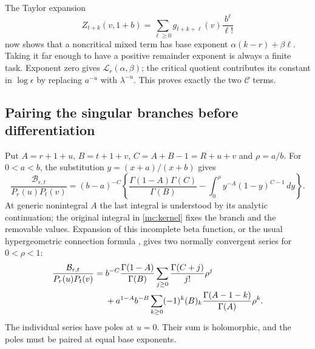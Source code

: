 \documentclass[11pt,a4paper]{article}
\numberwithin{equation}{section}
\theoremstyle{definition}
\theoremstyle{remark}
\begin{document}
The Taylor expansion
\[
 Z_{t+k}(v,1+b)=\sum_{\ell\ge0}
                       g_{t+k+\ell}(v)\frac{b^\ell}{\ell!}
\]
now shows that a noncritical mixed term has base exponent
$\alpha(k-r)+\beta\ell$. Taking it far enough to have a positive
remainder exponent is always a finite task. Exponent zero gives
$\mathscr L_r(\alpha,\beta)$; the critical quotient contributes
its constant in $\log\epsilon$ by replacing $a^{-u}$ with
$\lambda^{-u}$. This proves exactly the two $\mathcal C$ terms.

\subsection{Pairing the singular branches before differentiation}

Put $A=r+1+u$, $B=t+1+v$, $C=A+B-1=R+u+v$ and
$\rho=a/b$. For $0<a<b$, the substitution
$y=(x+a)/(x+b)$ gives
\begin{equation}\label{mc:incomplete-beta}
 \frac{\mathcal B_{r,t}}{P_r(u)P_t(v)}
  =(b-a)^{-C}\left\{
     \frac{\Gamma(1-A)\Gamma(C)}{\Gamma(B)}
      -\int_0^\rho y^{-A}(1-y)^{C-1}\,dy\right\}.
\end{equation}
At generic nonintegral $A$ the last integral is understood by its
analytic continuation; the original integral in
\eqref{mc:kernel} fixes the branch and the removable values.
Expansion of this incomplete beta function, or the usual
hypergeometric connection formula \cite[\S15.8]{DLMF}, gives
two normally convergent series for $0<\rho<1$:
\begin{align}\label{mc:two-branches}
 \frac{\mathcal B_{r,t}}{P_r(u)P_t(v)}
 ={}&b^{-C}\frac{\Gamma(1-A)}{\Gamma(B)}
             \sum_{j\ge0}\frac{\Gamma(C+j)}{j!}\rho^j\notag\\
 &+a^{1-A}b^{-B}
      \sum_{k\ge0}(-1)^k(B)_k
                         \frac{\Gamma(A-1-k)}{\Gamma(A)}\rho^k.
\end{align}
The individual series have poles at $u=0$. Their sum is
holomorphic, and the poles must be paired at equal base exponents.
\end{document}
